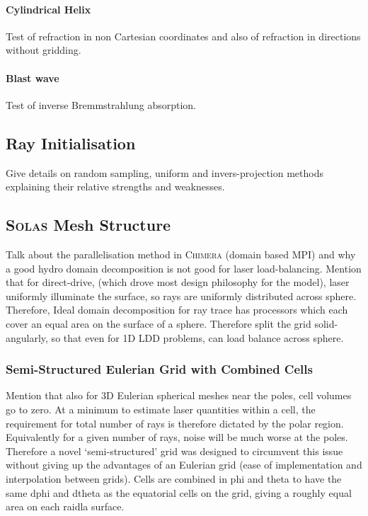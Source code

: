 \paragraph*{Cylindrical Helix}
Test of refraction in non Cartesian coordinates and also of refraction in directions without gridding.

\paragraph*{Blast wave}
Test of inverse Bremmstrahlung absorption.

\subsection{Ray Initialisation}

Give details on random sampling, uniform and invers-projection methods explaining their relative strengths and weaknesses.

\subsection{\textsc{Solas} Mesh Structure}

Talk about the parallelisation method in \textsc{Chimera} (domain based MPI) and why a good hydro domain decomposition is not good for laser load-balancing.
Mention that for direct-drive, (which drove most design philosophy for the model), laser uniformly illuminate the surface, so rays are uniformly distributed across sphere.
Therefore, Ideal domain decomposition for ray trace has processors which each cover an equal area on the surface of a sphere.
Therefore split the grid solid-angularly, so that even for 1D LDD problems, can load balance across sphere.

\subsubsection{Semi-Structured Eulerian Grid with Combined Cells}

Mention that also for 3D Eulerian spherical meshes near the poles, cell volumes go to zero.
At a minimum to estimate laser quantities within a cell, the requirement for total number of rays is therefore dictated by the polar region.
Equivalently for a given number of rays, noise will be much worse at the poles.
Therefore a novel `semi-structured' grid was designed to circumvent this issue without giving up the advantages of an Eulerian grid (ease of implementation and interpolation between grids).
Cells are combined in phi and theta to have the same dphi and dtheta as the equatorial cells on the grid, giving a roughly equal area on each raidla surface.

